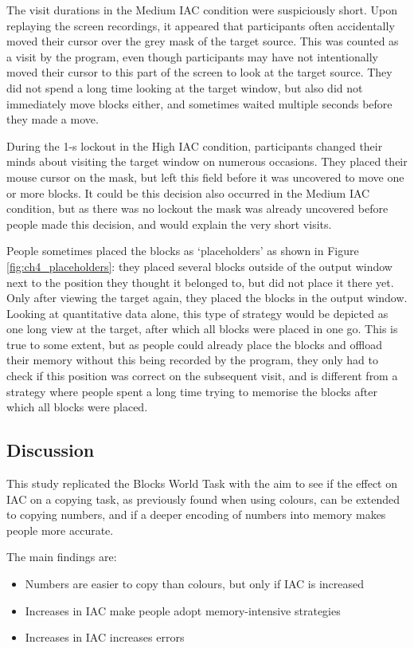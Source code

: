 \documentclass[11pt,oneside]{report}
\begin{document}
\begin{table}
The visit durations in the Medium IAC condition were suspiciously short. Upon replaying the screen recordings, it appeared that participants often accidentally moved their cursor over the grey mask of the target source. This was counted as a visit by the program, even though participants may have not intentionally moved their cursor to this part of the screen to look at the target source. They did not spend a long time looking at the target window, but also did not immediately move blocks either, and sometimes waited multiple seconds before they made a move. 

During the 1-s lockout in the High IAC condition, participants changed their minds about visiting the target window on numerous occasions. They placed their mouse cursor on the mask, but left this field before it was uncovered to move one or more blocks. It could be this decision also occurred in the Medium IAC condition, but as there was no lockout the mask was already uncovered before people made this decision, and would explain the very short visits.

People sometimes placed the blocks as `placeholders' as shown in Figure \ref{fig:ch4_placeholders}: they placed several blocks outside of the output window next to the position they thought it belonged to, but did not place it there yet. Only after viewing the target again, they placed the blocks in the output window. Looking at quantitative data alone, this type of strategy would be depicted as one long view at the target, after which all blocks were placed in one go. This is true to some extent, but as people could already place the blocks and offload their memory without this being recorded by the program, they only had to check if this position was correct on the subsequent visit, and is different from a strategy where people spent a long time trying to memorise the blocks after which all blocks were placed.



\subsection{Discussion}
This study replicated the Blocks World Task with the aim to see if the effect on IAC on a copying task, as previously found when using colours, can be extended to copying numbers, and if a deeper encoding of numbers into memory makes people more accurate.

The main findings are:

\begin{itemize}
\item
Numbers are easier to copy than colours, but only if IAC is increased
\item
Increases in IAC make people adopt memory-intensive strategies
\item
Increases in IAC increases errors
\end{itemize}


\end{table}
\end{document}

